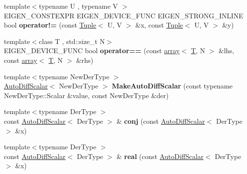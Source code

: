 \begin{DoxyCompactItemize}
\item 
\mbox{\label{namespace_eigen_ac38ad3798bd16a29798c2fc2d2dbe095}} 
{\footnotesize template$<$typename U , typename V $>$ }\\E\+I\+G\+E\+N\+\_\+\+C\+O\+N\+S\+T\+E\+X\+PR E\+I\+G\+E\+N\+\_\+\+D\+E\+V\+I\+C\+E\+\_\+\+F\+U\+NC E\+I\+G\+E\+N\+\_\+\+S\+T\+R\+O\+N\+G\+\_\+\+I\+N\+L\+I\+NE bool {\bfseries operator!=} (const \hyperlink{struct_eigen_1_1_tuple}{Tuple}$<$ U, V $>$ \&x, const \hyperlink{struct_eigen_1_1_tuple}{Tuple}$<$ U, V $>$ \&y)
\item 
\mbox{\label{namespace_eigen_a06b60e85b790c81d173482bae2b9c037}} 
{\footnotesize template$<$class T , std\+::size\+\_\+t N$>$ }\\E\+I\+G\+E\+N\+\_\+\+D\+E\+V\+I\+C\+E\+\_\+\+F\+U\+NC bool {\bfseries operator==} (const \hyperlink{class_eigen_1_1array}{array}$<$ \hyperlink{group___sparse_core___module}{T}, N $>$ \&lhs, const \hyperlink{class_eigen_1_1array}{array}$<$ \hyperlink{group___sparse_core___module}{T}, N $>$ \&rhs)
\item 
\mbox{\label{namespace_eigen_aa0955f67302586c01ba67c4fa11ec3f4}} 
{\footnotesize template$<$typename New\+Der\+Type $>$ }\\\hyperlink{class_eigen_1_1_auto_diff_scalar}{Auto\+Diff\+Scalar}$<$ New\+Der\+Type $>$ {\bfseries Make\+Auto\+Diff\+Scalar} (const typename New\+Der\+Type\+::\+Scalar \&value, const New\+Der\+Type \&der)
\item 
\mbox{\label{namespace_eigen_a065d353fcbff30a8e902d2900a784d45}} 
{\footnotesize template$<$typename Der\+Type $>$ }\\const \hyperlink{class_eigen_1_1_auto_diff_scalar}{Auto\+Diff\+Scalar}$<$ Der\+Type $>$ \& {\bfseries conj} (const \hyperlink{class_eigen_1_1_auto_diff_scalar}{Auto\+Diff\+Scalar}$<$ Der\+Type $>$ \&x)
\item 
\mbox{\label{namespace_eigen_aa71b5974e117d989a4e79f54ba65f460}} 
{\footnotesize template$<$typename Der\+Type $>$ }\\const \hyperlink{class_eigen_1_1_auto_diff_scalar}{Auto\+Diff\+Scalar}$<$ Der\+Type $>$ \& {\bfseries real} (const \hyperlink{class_eigen_1_1_auto_diff_scalar}{Auto\+Diff\+Scalar}$<$ Der\+Type $>$ \&x)
\item 

\end{DoxyCompactItemize}
